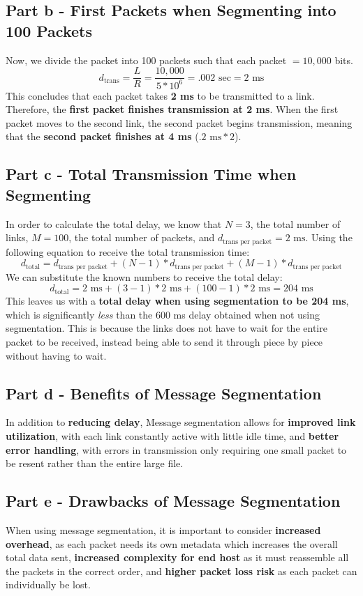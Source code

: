\documentclass{article}
\begin{document}
\subsection{Part b - First Packets when Segmenting into 100 Packets}
Now, we divide the packet into 100 packets such that each packet $= 10,000$ bits.
\[
d_{\text{trans}} = \frac{L}{R} = \frac{10,000}{5*10^6} = .002 \text{ sec} = 2 \text{ ms}
\]
This concludes that each packet takes \textbf{2 ms} to be transmitted to a link. Therefore, the \textbf{first packet finishes transmission at 2 ms}. When the first packet moves to the second link, the second packet begins transmission, meaning that the \textbf{second packet finishes at 4 ms} ($.2 \text{ ms} * 2$).
\subsection{Part c - Total Transmission Time when Segmenting}
In order to calculate the total delay, we know that $N = 3$, the total number of links, $M = 100$, the total number of packets, and $d_{\text{trans per packet}} = 2 \text{ ms}$. Using the following equation to receive the total transmission time:
\[
d_{\text{total}} = d_{\text{trans per packet}} + (N - 1) * d_{\text{trans per packet}} + (M - 1) * d_{\text{trans per packet}} 
\]
We can substitute the known numbers to receive the total delay:
\[
d_{\text{total}} = 2 \text{ ms} + (3-1) * 2 \text{ ms} + (100-1) * 2 \text{ ms} = 204 \text{ ms}
\]
This leaves us with a \textbf{total delay when using segmentation to be 204 ms}, which is significantly \textit{less} than the 600 ms delay obtained when not using segmentation. This is because the links does not have to wait for the entire packet to be received, instead being able to send it through piece by piece without having to wait.
\subsection{Part d - Benefits of Message Segmentation}
In addition to \textbf{reducing delay}, Message segmentation allows for \textbf{improved link utilization}, with each link constantly active with little idle time, and \textbf{better error handling}, with errors in transmission only requiring one small packet to be resent rather than the entire large file.
\subsection{Part e - Drawbacks of Message Segmentation}
When using message segmentation, it is important to consider \textbf{increased overhead}, as each packet needs its own metadata which increases the overall total data sent, \textbf{increased complexity for end host} as it must reassemble all the packets in the correct order, and \textbf{higher packet loss risk} as each packet can individually be lost.
\end{document}
